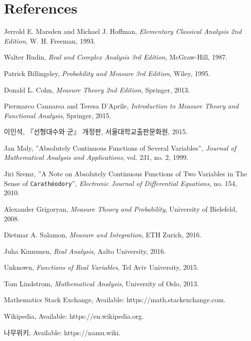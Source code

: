 \section*{References}
\normalsize\ttfamily
\begin{enumerate}[label = {[\arabic*]}]
    \item Jerrold E. Marsden and Michael J. Hoffman, \textit{Elementary Classical Analysis 2nd Edition}, W. H. Freeman, 1993.
    \item Walter Rudin, \textit{Real and Complex Analysis 3rd Edition}, McGraw-Hill, 1987.
    \item Patrick Billingsley, \textit{Probability and Measure 3rd Edition}, Wiley, 1995.
    \item Donald L. Cohn, \textit{Measure Theory 2nd Edition}, Springer, 2013.
    \item Piermarco Cannarsa and Teresa D'Aprile, \textit{Introduction to Measure Theory and Functional Analysis}, Springer, 2015.
    \item \textrm{이인석}, \textrm{『선형대수와 군』 개정판}, \textrm{서울대학교출판문화원}, 2015.
    \item Jan Maly, ''Absolutely Continuous Functions of Several Variables'', \textit{Journal of Mathematical Analysis and Applications}, vol. 231, no. 2, 1999.
    \item Jiri Sremr, ''A Note on Absolutely Continuous Functions of Two Variables in The Sense of \texttt{Carath\'eodory}'', \textit{Electronic Journal of Differential Equations}, no. 154, 2010.
    \item Alexander Grigoryan, \textit{Measure Theory and Probability}, University of Bielefeld, 2008.
    \item Dietmar A. Salamon, \textit{Measure and Integration}, ETH Zurich, 2016.
    \item Juha Kinnunen, \textit{Real Analysis}, Aalto University, 2016.
    \item Unknown, \textit{Functions of Real Variables}, Tel Aviv University, 2015.
    \item Tom Lindstrom, \textit{Mathematical Analysis}, University of Oslo, 2013.
    \item Mathematics Stack Exchange, Available: https://math.stackexchange.com.
    \item Wikipedia, Available: https://en.wikipedia.org.
    \item \textrm{나무위키}, Available: https://namu.wiki.
\end{enumerate}